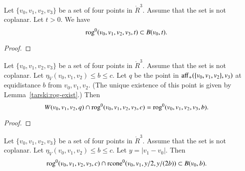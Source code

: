 \begin{tarskidata}
\begin{tarski}

\begin{lemma}
Let $\{v_0,v_1,v_2,v_3\}$ be a set of four points in $\ring{R}^3$.
Assume that the set is not coplanar.
Let $t>0$.  We have
$$
   {\operatorname{rog}}^0(v_0,v_1,v_2,v_3,t) \subset B(v_0,t).
$$
\end{lemma}

\begin{proof}
\end{proof}
\end{tarski}





\begin{tarski}

\begin{lemma}
Let $\{v_0,v_1,v_2,v_3\}$ be a set of four points in $\ring{R}^3$.
Assume that the set is not coplanar.
Let $\eta_V(v_0,v_1,v_2) \le b \le c$.  Let $q$ be the point
in ${\operatorname{aff}}_+(\{v_0,v_1,v_2\},v_3)$ at equidistance $b$
from $v_0,v_1,v_2$.  (The unique existence of this point is given
by Lemma~\ref{tarski:rog-exist}.)  Then
$$
W(v_0,v_1,v_2,q) \cap {\operatorname{rog}}^0(v_0,v_1,v_2,v_3,c) = 
  {\operatorname{rog}}^0(v_0,v_1,v_2,v_3,b).
$$
\end{lemma}

\begin{proof}
\end{proof}
\end{tarski}





\begin{tarski}

\begin{lemma}
Let $\{v_0,v_1,v_2,v_3\}$ be a set of four points in $\ring{R}^3$.
Assume that the set is not coplanar.
Let $\eta_V(v_0,v_1,v_2)\le b\le c$.  Let $y=|v_1-v_0|$.
Then
$$
{\operatorname{rog}}^0(v_0,v_1,v_2,v_3,c) \cap {\operatorname{rcone}}^0(v_0,v_1,y/2,y/(2b))
\subset B(v_0,b).
$$
\end{lemma}


\end{tarski}
\end{tarskidata}
